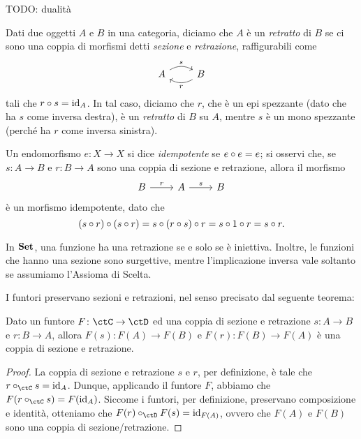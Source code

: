 TODO: dualità

\begin{definition}[Retratto]
	Dati due oggetti \(A\) e \(B\) in una categoria,
	diciamo che \(A\) è un \emph{retratto} di \(B\) se ci sono una coppia di morfismi detti \emph{sezione} e \emph{retrazione}, raffigurabili come
	\begin{equation}
		\begin{tikzcd}
			A \ar[r, bend left, "s"] &B \ar[l, bend left, "r"]
		\end{tikzcd}
	\end{equation}
  tali che \(r \circ s = \mathrm{id}_A\).
	In tal caso, diciamo che \(r\), che è un epi spezzante (dato che ha $s$ come inversa destra), è un \emph{retratto} di \(B\) su \(A\), mentre \(s\) è un mono spezzante (perché ha $r$ come inversa sinistra).
\end{definition}
\begin{remark}
	Un endomorfismo $e : X\to X$ si dice \emph{idempotente} se $e\circ e=e$; si osservi che, se \(s \colon A \to B\) e \(r \colon B \to A\) sono una coppia di sezione e retrazione,
	allora il morfismo
	\begin{equation}
		\begin{tikzcd}
			B \ar[r, "r"] & A \ar[r, "s"] &B
		\end{tikzcd}
	\end{equation}
	è un morfismo idempotente, dato che
	\[(s\circ r)\circ (s\circ r) = s\circ (r\circ s)\circ r = s\circ 1\circ r=s\circ r.\]
\end{remark}

\begin{example}
	\label{exm:set-sezioni-retrazioni}
	In \(\mathbf{Set}\), una funzione ha una retrazione se e solo se è iniettiva.
	Inoltre, le funzioni che hanno una sezione sono surgettive,
	mentre l'implicazione inversa vale soltanto se assumiamo l'Assioma di Scelta.
\end{example}

I funtori preservano sezioni e retrazioni,
nel senso precisato dal seguente teorema:

\begin{theorem}%
	\label{thm:fun-sezioni-retrazioni}
	Dato un funtore \(F \colon \ctC \to \ctD\) ed una coppia di sezione e retrazione \(s \colon A \to B\) e \(r \colon B \to A\),
	allora \(F(s) \colon F(A) \to F(B)\) e \(F(r) \colon F(B) \to F(A)\) è una coppia di sezione e retrazione.
\end{theorem}
\begin{proof}
	La coppia di sezione e retrazione \(s\) e \(r\),
	per definizione, è tale che \(r \cmp_{\ctC} s = \id_A\).
	Dunque, applicando il funtore \(F\), abbiamo che \(F(r \cmp_{\ctC} s) = F(\id_A)\).
	Siccome i funtori, per definizione, preservano composizione e identità,
	otteniamo che \(F(r) \cmp_{\ctD} F(s) = \id_{F(A)}\),
	ovvero che \(F(A)\) e \(F(B)\) sono una coppia di sezione/retrazione.
\end{proof}

